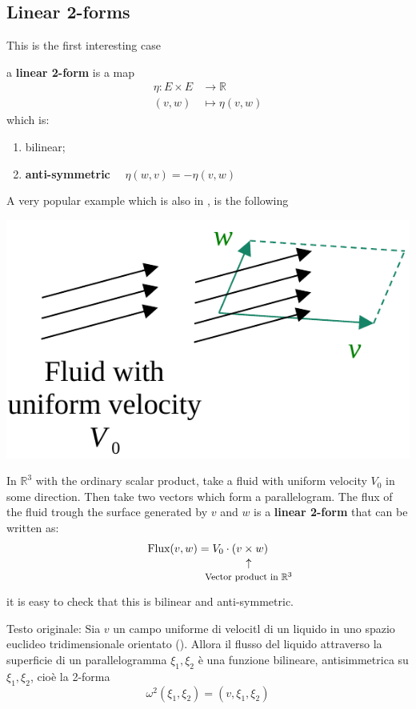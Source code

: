 \documentclass[../main.tex]{subfiles}
\begin{document}
\subsection{Linear 2-forms}
This is the first interesting case
\begin{definition}
a \textbf{linear 2-form} is a map
\[
\begin{split}
\eta : E\times E& \to  \mathbb{R}\\
(v,w) &\mapsto \eta(v,w)
\end{split}
\]
which is:
\begin{enumerate}
    \item bilinear;
    \item \textbf{anti-symmetric} \(\quad \eta(w,v)=-\eta(v,w)\)
\end{enumerate}
\end{definition}
A very popular example which is also in , is the following
\begin{marginfigure}[8mm]
	\includegraphics[width=1.1\linewidth]{images/fluid_as_linear_2form.pdf}
	\caption[Flux of a fluid as 2-form]{}
\end{marginfigure} 
\begin{example}
In $\mathbb{R}^3$ with the ordinary scalar product, take a fluid with uniform velocity $V_0$ in some direction. Then take two vectors which form a parallelogram. The flux of the fluid trough the surface generated by $v$ and $w$ is a \textbf{linear 2-form} that can be written as:
\[
\textrm{Flux}(v,w)=V_0\cdot(v\underset{\mathclap{\tikz \node {$\uparrow$} node [below=1ex] {\footnotesize Vector product in $\mathbb{R}^3$};}}{\times} w)
\]
it is easy to check that this is bilinear and anti-symmetric.

Testo originale: Sia $v$ un campo uniforme di velocitl di un liquido in uno spazio euclideo tridimensionale orientato (). Allora il flusso del liquido attraverso la superficie di un parallelogramma $\xi_1,\xi_2$ è una funzione bilineare, antisimmetrica su $\xi_1,\xi_2$, cioè la 2-forma
\[
\omega^2(\xi_1,\xi_2)=(v,\xi_1,\xi_2)
\]
\end{example}
\end{document}

